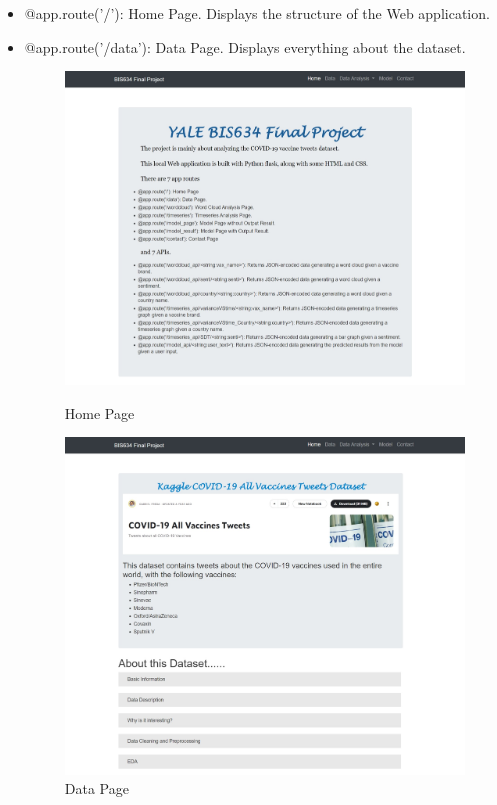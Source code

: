 \documentclass{article}
\begin{document}
\begin{itemize}
    \item @app.route('/'): Home Page. Displays the structure of the Web application.
    \item @app.route('/data'): Data Page. Displays everything about the dataset.
    
    \begin{figure}[H]
    \centering
    \begin{minipage}[H]{.5\textwidth}
      \centering
      \includegraphics[width=\linewidth]{HomePage.jpeg}
      \caption{Home Page}
    \end{minipage}%
    \begin{minipage}[H]{.5\textwidth}
      \centering
      \includegraphics[width=\linewidth]{DataPage.jpeg}
      \caption{Data Page}
    \end{minipage}
    \end{figure}
    

\end{itemize}
\end{document}
